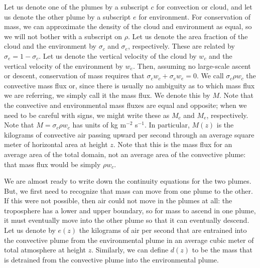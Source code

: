 \documentclass[12pt]{article}
\begin{document}
Let us denote one of the plumes by a subscript $c$ for convection or cloud, and let us denote the other plume by a subscript $e$ for environment.  For conservation of mass, we can approximate the density of the cloud and environment as equal, so we will not bother with a subscript on $\rho$.  Let us denote the area fraction of the cloud and the environment by $\sigma_c$ and $\sigma_e$, respectively.  These are related by $\sigma_e = 1 - \sigma_c$.  Let us denote the vertical velocity of the cloud by $w_c$ and the vertical velocity of the environment by $w_e$.  Then, assuming no large-scale ascent or descent, conservation of mass requires that $\sigma_c w_c + \sigma_e w_e = 0$.  We call $\sigma_c \rho w_c$ the convective mass flux or, since there is usually no ambiguity as to which mass flux we are referring, we simply call it the mass flux.  We denote this by $M$.  Note that the convective and environmental mass fluxes are equal and opposite; when we need to be careful with signs, we might write these as $M_c$ and $M_e$, respectively.  Note that $M = \sigma_c \rho w_c$ has units of kg m$^{-2}$ s$^{-1}$.  In particular, $M(z)$ is the kilograms of convective air passing upward per second through an average square meter of horizontal area at height $z$.  Note that this is the mass flux for an average area of the total domain, not an average area of the convective plume: that mass flux would be simply $\rho w_c$.


We are almost ready to write down the continuity equations for the two plumes.  But, we first need to recognize that mass can move from one plume to the other.  If this were not possible, then air could not move in the plumes at all: the troposphere has a lower and upper boundary, so for mass to ascend in one plume, it must eventually move into the other plume so that it can eventually descend.  Let us denote by $e(z)$ the kilograms of air per second that are entrained into the convective plume from the environmental plume in an average cubic meter of total atmosphere at height $z$.  Similarly, we can define $d(z)$ to be the mass that is detrained from the convective plume into the environmental plume.
\end{document}
